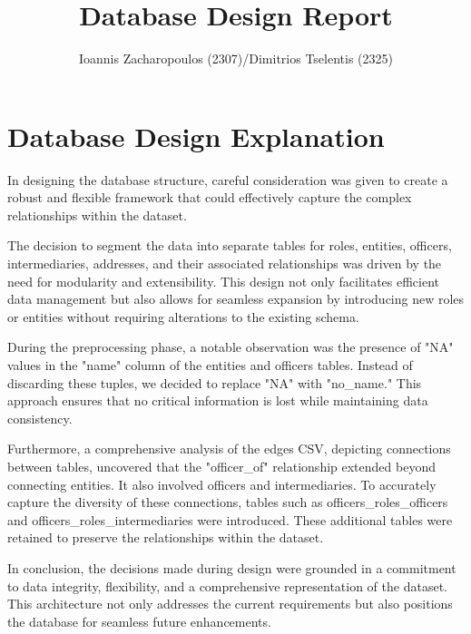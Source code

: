 \documentclass{article}
\title{Database Design Report}
\author{Ioannis Zacharopoulos (2307)/Dimitrios Tselentis (2325)}
\begin{document}
\maketitle

\section*{\centering Database Design Explanation}

In designing the database structure, careful consideration was given to create a robust and flexible framework that could effectively capture the complex relationships within the dataset.

The decision to segment the data into separate tables for roles, entities, officers, intermediaries, addresses, and their associated relationships was driven by the need for modularity and extensibility. This design not only facilitates efficient data management but also allows for seamless expansion by introducing new roles or entities without requiring alterations to the existing schema.

During the preprocessing phase, a notable observation was the presence of "NA" values in the "name" column of the entities and officers tables. Instead of discarding these tuples, we decided to replace "NA" with "no\_name." This approach ensures that no critical information is lost while maintaining data consistency.

Furthermore, a comprehensive analysis of the edges CSV, depicting connections between tables, uncovered that the "officer\_of" relationship extended beyond connecting entities. It also involved officers and intermediaries. To accurately capture the diversity of these connections, tables such as officers\_roles\_officers and officers\_roles\_intermediaries were introduced. These additional tables were retained to preserve the relationships within the dataset.

In conclusion, the decisions made during design were grounded in a commitment to data integrity, flexibility, and a comprehensive representation of the dataset. This architecture not only addresses the current requirements but also positions the database for seamless future enhancements.
\end{document}

